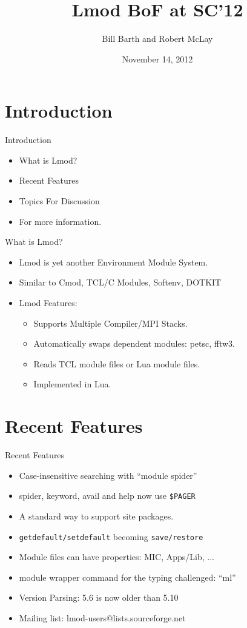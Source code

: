 \documentclass{beamer}
\title{Lmod BoF at SC'12}
\author{Bill Barth and Robert McLay}
\institute{The Texas Advanced Computing Center}
\date{November 14, 2012}  %
\begin{document}
\begin{frame}
  \titlepage
\end{frame}

\section{Introduction}

\begin{frame}{Introduction}
  \begin{itemize}
    \item What is Lmod?
    \item Recent Features
    \item Topics For Discussion
    \item For more information.
  \end{itemize}
\end{frame}


\begin{frame}{What is Lmod?}
  \begin{itemize}
    \item Lmod is yet another Environment Module System.
    \item Similar to Cmod, TCL/C Modules, Softenv, DOTKIT
    \item Lmod Features:
      \begin{itemize}
        \item Supports Multiple Compiler/MPI Stacks.
        \item Automatically swaps dependent modules: petsc, fftw3.
        \item Reads TCL module files or Lua module files.
        \item Implemented in Lua.
      \end{itemize}
  \end{itemize}
\end{frame}

\section{Recent Features}

\begin{frame}{Recent Features}
  \begin{itemize}
    \item Case-insensitive searching with ``module spider''
    \item spider, keyword, avail and help now use \texttt{\$PAGER}
    \item A standard way to support site packages.
    \item \texttt{getdefault/setdefault} becoming \texttt{save/restore}
    \item Module files can have properties: MIC, Apps/Lib, ...
    \item module wrapper command for the typing challenged: ``ml''
    \item Version Parsing: 5.6 is now older than 5.10
    \item Mailing list: lmod-users@lists.sourceforge.net
  \end{itemize}
\end{frame}
\end{document}
